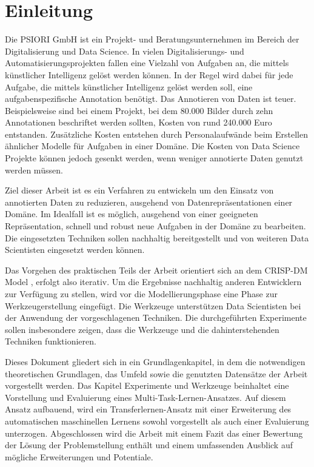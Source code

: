 \chapter{Einleitung}
\label{chap:Einleitung}
	Die PSIORI GmbH \cite{PSIORIGmbH.2020} ist ein Projekt- und Beratungsunternehmen im Bereich der Digitalisierung und Data Science. In vielen Digitalisierungs- und Automatisierungsprojekten fallen eine Vielzahl von Aufgaben an, die mittels künstlicher Intelligenz gelöst werden können. In der Regel wird dabei für jede Aufgabe, die mittels künstlicher Intelligenz gelöst werden soll, eine aufgabenspezifische Annotation benötigt. Das Annotieren von Daten ist teuer. Beispielsweise sind bei einem Projekt, bei dem 80.000 Bilder durch zehn Annotationen beschriftet werden sollten, Kosten von rund 240.000 Euro entstanden. Zusätzliche Kosten entstehen durch Personalaufwände beim Erstellen ähnlicher Modelle für Aufgaben in einer Domäne. Die Kosten von Data Science Projekte können jedoch gesenkt werden, wenn weniger annotierte Daten genutzt werden müssen.
	
	Ziel dieser Arbeit ist es ein Verfahren zu entwickeln um den Einsatz von annotierten Daten zu reduzieren, ausgehend von Datenrepräsentationen einer Domäne. Im Idealfall ist es möglich, ausgehend von einer geeigneten Repräsentation, schnell und robust neue Aufgaben in der Domäne zu bearbeiten. Die eingesetzten Techniken sollen nachhaltig bereitgestellt und von weiteren Data Scientisten eingesetzt werden können.
	
	Das Vorgehen des praktischen Teils der Arbeit orientiert sich an dem CRISP-DM Model \cite{Shearer.2000}, erfolgt also iterativ. Um die Ergebnisse nachhaltig anderen Entwicklern zur Verfügung zu stellen, wird vor die Modellierungsphase eine Phase zur Werkzeugerstellung eingefügt. Die Werkzeuge unterstützen Data Scientisten bei der Anwendung der vorgeschlagenen Techniken. Die durchgeführten Experimente sollen insbesondere zeigen, dass die Werkzeuge und die dahinterstehenden Techniken funktionieren. 
	
	Dieses Dokument gliedert sich in ein Grundlagenkapitel, in dem die notwendigen theoretischen Grundlagen, das Umfeld sowie die genutzten Datensätze der Arbeit vorgestellt werden. Das Kapitel Experimente und Werkzeuge beinhaltet eine Vorstellung und Evaluierung eines Multi-Task-Lernen-Ansatzes. Auf diesem Ansatz aufbauend, wird ein Transferlernen-Ansatz mit einer Erweiterung des automatischen maschinellen Lernens sowohl vorgestellt als auch einer Evaluierung unterzogen. Abgeschlossen wird die Arbeit mit einem Fazit das einer Bewertung der Lösung der Problemstellung enthält und einem umfassenden Ausblick auf mögliche Erweiterungen und Potentiale.
